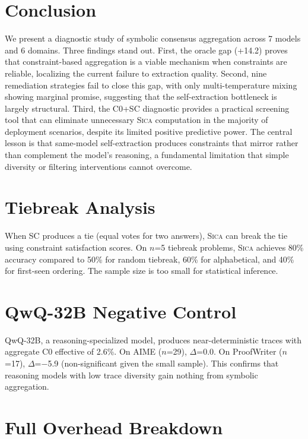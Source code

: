 \documentclass[11pt,a4paper]{article}
\newcommand{\sica}{\textsc{Sica}}
\newcommand{\pp}{\text{pp}}
\begin{document}
\section{Conclusion}

We present a diagnostic study of symbolic consensus aggregation across 7 models and 6 domains.
Three findings stand out.
First, the oracle gap (+14.2\pp{}) proves that constraint-based aggregation is a viable mechanism when constraints are reliable, localizing the current failure to extraction quality.
Second, nine remediation strategies fail to close this gap, with only multi-temperature mixing showing marginal promise, suggesting that the self-extraction bottleneck is largely structural.
Third, the C0+SC diagnostic provides a practical screening tool that can eliminate unnecessary \sica{} computation in the majority of deployment scenarios, despite its limited positive predictive power.
The central lesson is that same-model self-extraction produces constraints that mirror rather than complement the model's reasoning, a fundamental limitation that simple diversity or filtering interventions cannot overcome.




\appendix

\section{Tiebreak Analysis}
\label{app:tiebreak}

When SC produces a tie (equal votes for two answers), \sica{} can break the tie using constraint satisfaction scores. On $n$=5 tiebreak problems, \sica{} achieves 80\% accuracy compared to 50\% for random tiebreak, 60\% for alphabetical, and 40\% for first-seen ordering. The sample size is too small for statistical inference.

\section{QwQ-32B Negative Control}
\label{app:qwq}

QwQ-32B, a reasoning-specialized model, produces near-deterministic traces with aggregate C0 effective of 2.6\%. On AIME ($n$=29), $\Delta$=0.0\pp{}. On ProofWriter ($n$=17), $\Delta$=$-$5.9\pp{} (non-significant given the small sample). This confirms that reasoning models with low trace diversity gain nothing from symbolic aggregation.

\section{Full Overhead Breakdown}
\label{app:overhead}
\end{document}

